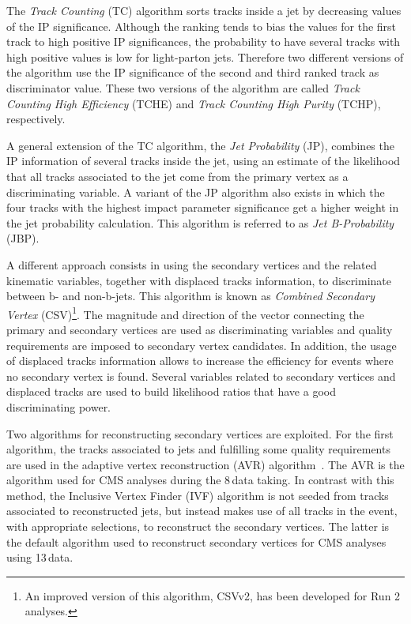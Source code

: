 The \emph{Track Counting} (TC) algorithm sorts tracks inside a jet by decreasing values of the IP significance. Although the ranking tends to bias the values for the first track to high positive IP significances, the probability to have several tracks with high positive values is low for light-parton jets. Therefore two different versions of the algorithm use the IP significance of the second and third ranked track as discriminator value.  These two versions of the algorithm are called \emph{Track Counting High Efficiency} (TCHE) and \emph{Track Counting High Purity} (TCHP), respectively.

A general extension of the TC algorithm, the \emph{Jet Probability} (JP), combines the IP information of several tracks inside the jet, using an estimate of the likelihood that all tracks associated to the jet come from the primary vertex as a discriminating variable. A variant of
the JP algorithm also exists in which the four tracks with the highest impact parameter significance get a higher weight in the jet probability calculation. This algorithm is referred to as \emph{Jet B-Probability} (JBP).

A different approach consists in using the secondary vertices and the related kinematic variables, together with displaced tracks information, to discriminate between b- and non-b-jets. This algorithm is known as \emph{Combined Secondary Vertex} (CSV)\footnote{An improved version of this algorithm, CSVv2, has been developed for Run 2 analyses.}. The magnitude and direction of the vector connecting the primary and secondary vertices are used as discriminating variables and quality requirements are imposed to secondary vertex candidates. In addition, the usage of displaced tracks information allows to increase the efficiency for events where no secondary vertex is found. Several variables related to secondary vertices and displaced tracks are used to build likelihood ratios that have a good discriminating power.

Two algorithms for reconstructing secondary vertices are exploited. For the first algorithm, the
tracks associated to jets and fulfilling some quality requirements are used in the adaptive vertex reconstruction (AVR) algorithm~\cite{Waltenberger:1166320}. The AVR is the algorithm used for CMS analyses during the 8\,\TeV data taking. In contrast with this method, the Inclusive Vertex Finder (IVF) algorithm is not seeded from tracks associated to reconstructed jets, but instead makes use of all tracks in the event, with appropriate selections, to reconstruct the secondary vertices. The latter is the default algorithm used to reconstruct secondary vertices for CMS analyses using 13\,\TeV data.

